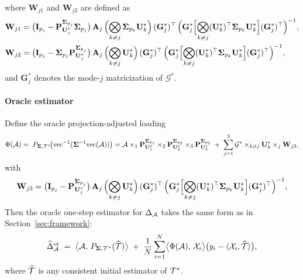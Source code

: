 \documentclass[authoryear,preprint,review,12pt]{elsarticle}
\begin{document}
	where $\mathbf{W}_{j1}$ and $\mathbf{W}_{j2}$ are defined as
	\begin{align*}
		\mathbf{W}_{j1}
		&=
		\bigl(\mathbf{I}_{p_j}-\mathbf{P}_{\mathbf{U}_j^\ast}^{\mathbf{ \Sigma}_{p_j}}\mathbf{ \Sigma}_{p_j}\bigr)\,
		\mathbf{A}_j\,
		\Bigl(\bigotimes_{k\neq j}\mathbf{ \Sigma}_{p_k}\mathbf{U}_k^\ast\Bigr)\,
		(\mathbf{G}_j^\ast)^\top\,
		\Bigl(\mathbf{G}_j^\ast \Bigl[\bigotimes_{k\neq j}(\mathbf{U}_k^\ast)^\top\mathbf{ \Sigma}_{p_k}\mathbf{U}_k^\ast\Bigr](\mathbf{G}_j^\ast)^\top\Bigr)^{-1},
		\\
		\mathbf{W}_{j2} 
		&=
		\bigl(\mathbf{I}_{p_j}-\mathbf{ \Sigma}_{p_j}\mathbf{P}_{\mathbf{U}_j^\ast}^{\mathbf{ \Sigma}_{p_j}}\bigr)\,
		\mathbf{A}_j\,
		\Bigl(\bigotimes_{k\neq j}\mathbf{U}_k^\ast\Bigr)\,
		(\mathbf{G}_j^\ast)^\top\,
		\Bigl(\mathbf{G}_j^\ast \Bigl[\bigotimes_{k\neq j}(\mathbf{U}_k^\ast)^\top\mathbf{ \Sigma}_{p_k}\mathbf{U}_k^\ast\Bigr](\mathbf{G}_j^\ast)^\top\Bigr)^{-1},
	\end{align*}
	and $\mathbf{G}_j^\ast$ denotes the mode-$j$ matricization of $\mathcal{G}^\ast$.
	
	
	
	\paragraph{Oracle estimator}
	Define the oracle projection-adjusted loading
	\begin{equation}
		\Phi(\mathcal{A})
		=\;
		P_{\mathbf{ \Sigma},\mathcal{T}^\ast}\!\bigl(\mathrm{vec}^{-1}(\mathbf{ \Sigma}^{-1}\mathrm{vec}(\mathcal{A}))\bigr)  
		=
		\mathcal{A}\times_1 \mathbf{P}_{\mathbf{U}_1^\ast}^{\mathbf{ \Sigma}_{p_1}} 
		\times_2 \mathbf{P}_{\mathbf{U}_2^\ast}^{\mathbf{ \Sigma}_{p_2}} 
		\times_3 \mathbf{P}_{\mathbf{U}_3^\ast}^{\mathbf{ \Sigma}_{p_3}} 
		\;+\;
		\sum_{j=1}^3 \mathcal{G}^\ast \times_{k\neq j}\mathbf{U}_k^\ast \times_j \mathbf{W}_{j3},
		\label{eq:tucker:Phi-oracle}
	\end{equation}
	with 
	\[\mathbf{W}_{j3}=
	\bigl(\mathbf{I}_{p_j}-\mathbf{P}_{\mathbf{U}_j^\ast}^{\mathbf{ \Sigma}_{p_j}} \bigr)\,
	\mathbf{A}_j\,
	\Bigl(\bigotimes_{k\neq j} \mathbf{U}_k^\ast\Bigr)\,
	(\mathbf{G}_j^\ast)^\top\,
	\Bigl(\mathbf{G}_j^\ast \Bigl[\bigotimes_{k\neq j}(\mathbf{U}_k^\ast)^\top\mathbf{ \Sigma}_{p_k}\mathbf{U}_k^\ast\Bigr](\mathbf{G}_j^\ast)^\top\Bigr)^{-1},
	\]
	Then the oracle one-step estimator for $\Delta_{\mathcal{A}}$ takes the same form as in Section~\ref{sec:framework}:
	\begin{equation}
		\widehat{\Delta}^{\mathrm{or}}_{\mathcal{A}}
		\;=\;
		\bigl\langle \mathcal{A},\, P_{\mathbf{ \Sigma},\mathcal{T}^\ast}(\widehat{\mathcal{T}}) \bigr\rangle
		\;+\;
		\frac{1}{N}\sum_{i=1}^N
		\bigl\langle \Phi(\mathcal{A}),\, \mathcal{X}_i \bigr\rangle
		\bigl(y_i-\langle \mathcal{X}_i, \widehat{\mathcal{T}}\rangle\bigr),
		\label{eq:tucker:oracle-est}
	\end{equation}
	where $\widehat{\mathcal{T}}$ is any   consistent initial estimator of $\mathcal{T}^\ast$.
	
\end{document}
